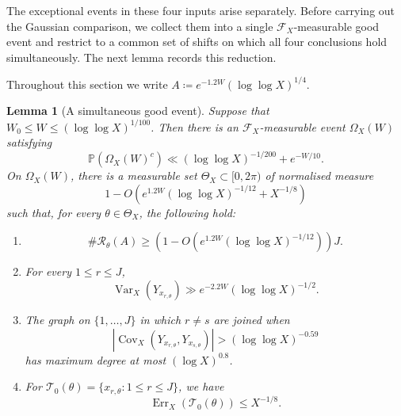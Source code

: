 \documentclass[a4paper,12pt,reqno]{amsart}
\numberwithin{equation}{section}
\newtheorem{lemma}[theorem]{Lemma}
\theoremstyle{remark}
\newcommand{\p}{\mathbb{P}}
\newcommand{\var}{\operatorname{Var}}
\newcommand{\cov}{\operatorname{Cov}}
\begin{document}
The exceptional events in these four inputs arise separately. Before
carrying out the Gaussian comparison, we collect them into a single
\(\mathscr F_X\)-measurable good event and restrict to a common set of
shifts on which all four conclusions hold simultaneously. The next lemma records
this reduction.

Throughout this section we write
$A\coloneqq e^{-1.2W}(\log\log X)^{1/4}$.

\begin{lemma}[A simultaneous good event]
\label{lem:aggregate-good-event}
Suppose that \(W_0\leq W\leq(\log\log X)^{1/100}\).
Then there is an \(\mathscr F_X\)-measurable event \(\Omega_X(W)\) satisfying
\begin{equation}\label{eq:old-good-probability}
 \p(\Omega_X(W)^c)
 \ll
 (\log\log X)^{-1/200}
 +e^{-W/10}.
\end{equation}
On \(\Omega_X(W)\), there is a measurable set
\(\Theta_X\subset[0,2\pi)\) of normalised measure
\[
 1-O\left(
 e^{1.2W}(\log\log X)^{-1/12}+X^{-1/8}
 \right)
\]
such that, for every \(\theta\in\Theta_X\), the following hold:
\begin{enumerate}
 \item
 \[
  \#\mathcal R_\theta(A)
  \geq
  \left(
  1-O\left(e^{1.2W}(\log\log X)^{-1/12}\right)
  \right)J.
 \]

 \item For every \(1\leq r\leq J\),
 \begin{equation}\label{eq:increment-variance-input}
  \var_X(Y_{x_{r,\theta}})
  \gg e^{-2.2W}(\log\log X)^{-1/2}.
 \end{equation}

 \item The graph on \(\{1,\ldots,J\}\) in which \(r\ne s\) are joined when
 \begin{equation}\label{eq:bad-covariance-edge}
  \left|
  \cov_X(Y_{x_{r,\theta}},Y_{x_{s,\theta}})
  \right|
  >(\log\log X)^{-0.59}
 \end{equation}
 has maximum degree at most \((\log X)^{0.8}\).

 \item For
 \(\mathcal T_0(\theta)=\{x_{r,\theta}:1\leq r\leq J\}\), we have
 \[
  \operatorname{Err}_X(\mathcal T_0(\theta))\leq X^{-1/8}.
 \]
\end{enumerate}
\end{lemma}
\end{document}
